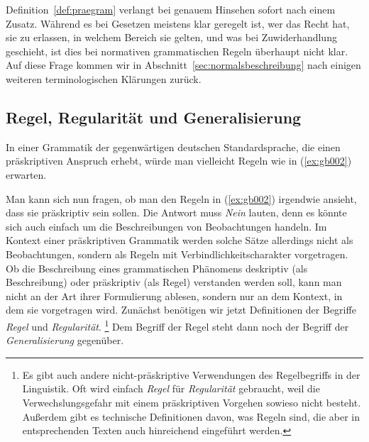 
Definition~\ref{def:praegram} verlangt bei genauem Hinsehen sofort nach einem Zusatz.
Während es bei Gesetzen meistens klar geregelt ist, wer das Recht hat, sie zu erlassen, in welchem Bereich sie gelten, und was bei Zuwiderhandlung geschieht, ist dies bei normativen grammatischen Regeln überhaupt nicht klar.
Auf diese Frage kommen wir in Abschnitt~\ref{sec:normalsbeschreibung} nach einigen weiteren terminologischen Klärungen zurück.

\subsection{Regel, Regularität und Generalisierung}

\label{sec:regulgen}

In einer Grammatik der gegenwärtigen deutschen Standardsprache, die einen präskriptiven Anspruch erhebt, würde man vielleicht Regeln wie in (\ref{ex:gb002}) erwarten.

\begin{exe}
  \ex\label{ex:gb002}
  \begin{xlist}
  \end{xlist}
\end{exe}

Man kann sich nun fragen, ob man den Regeln in (\ref{ex:gb002}) irgendwie ansieht, dass sie präskriptiv sein sollen.
Die Antwort muss \textit{Nein} lauten, denn es könnte sich auch einfach um die Beschreibungen von Beobachtungen handeln.
Im Kontext einer präskriptiven Grammatik werden solche Sätze allerdings nicht als Beobachtungen, sondern als Regeln mit Verbindlichkeitscharakter vorgetragen.
Ob die Beschreibung eines grammatischen Phänomens deskriptiv (als Beschreibung) oder präskriptiv (als Regel) verstanden werden soll, kann man nicht an der Art ihrer Formulierung ablesen, sondern nur an dem Kontext, in dem sie vorgetragen wird.
Zunächst benötigen wir jetzt Definitionen der Begriffe \textit{Regel} und \textit{Regularität}.%
\footnote{Es gibt auch andere nicht-präskriptive Verwendungen des Regelbegriffs in der Linguistik.
Oft wird einfach \textit{Regel} für \textit{Regularität} gebraucht, weil die Verwechslungsgefahr mit einem präskriptiven Vorgehen sowieso nicht besteht.
Außerdem gibt es technische Definitionen davon, was Regeln sind, die aber in entsprechenden Texten auch hinreichend eingeführt werden.}
Dem Begriff der Regel steht dann noch der Begriff der \textit{Generalisierung} gegenüber.

